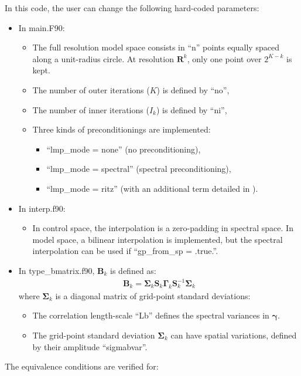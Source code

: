 \documentclass[12pt]{scrartcl}
\begin{document}
In this code, the user can change the following hard-coded parameters:
\begin{itemize}
\item In main.F90:
\begin{itemize}
\item The full resolution model space consists in ``n'' points equally spaced along a unit-radius circle. At resolution $\mathbf{R}^k$, only one point over $2^{K-k}$ is kept.
\item The number of outer iterations ($K$) is defined by ``no'',
\item The number of inner iterations ($I_k$) is defined by ``ni'',
\item Three kinds of preconditionings are implemented:
\begin{itemize}
\item ``lmp\_mode = none'' (no preconditioning),
\item ``lmp\_mode = spectral'' (spectral preconditioning),
\item ``lmp\_mode = ritz'' (with an additional term detailed in \citet{gurol_phd_2013}).
\end{itemize}
\end{itemize}
\item In interp.f90:
\begin{itemize}
\item In control space, the interpolation is a zero-padding in spectral space. In model space, a bilinear interpolation is implemented, but the spectral interpolation can be used if ``gp\_from\_sp = .true.''.
\end{itemize}
\item In type\_bmatrix.f90, $\mathbf{B}_k$ is defined as:
\begin{align}
\mathbf{B}_k = \boldsymbol{\Sigma}_k \mathbf{S}_k \boldsymbol{\Gamma}_k \mathbf{S}_k^{-1} \boldsymbol{\Sigma}_k
\end{align}
where $\boldsymbol{\Sigma}_k$ is a diagonal matrix of grid-point standard deviations:
\begin{itemize}
\item The correlation length-scale ``Lb'' defines the spectral variances in $\boldsymbol{\gamma}$.
\item The grid-point standard deviation $\boldsymbol{\Sigma}_k$ can have spatial variations, defined by their amplitude ``sigmabvar''.
\end{itemize}
\end{itemize}
$  $\\
The equivalence conditions are verified for:
\end{document}
